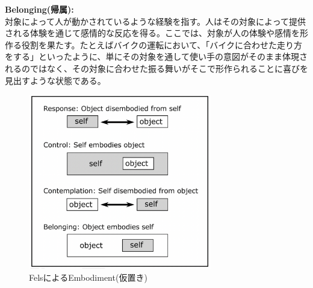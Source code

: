 \textbf{Belonging(帰属):}\\
対象によって人が動かされているような経験を指す。人はその対象によって提供される体験を通じて感情的な反応を得る。ここでは、対象が人の体験や感情を形作る役割を果たす。たとえばバイクの運転において、「バイクに合わせた走り方をする」といったように、単にその対象を通して使い手の意図がそのまま体現されるのではなく、その対象に合わせた振る舞いがそこで形作られることに喜びを見出すような状態である。

\begin{figure}[H]
  \centering
  \includegraphics[width=8cm]{img/fels_diagram.png}
  \caption{FelsによるEmbodiment(仮置き)}
  \label{fig:fels_embodiment}
\end{figure}



